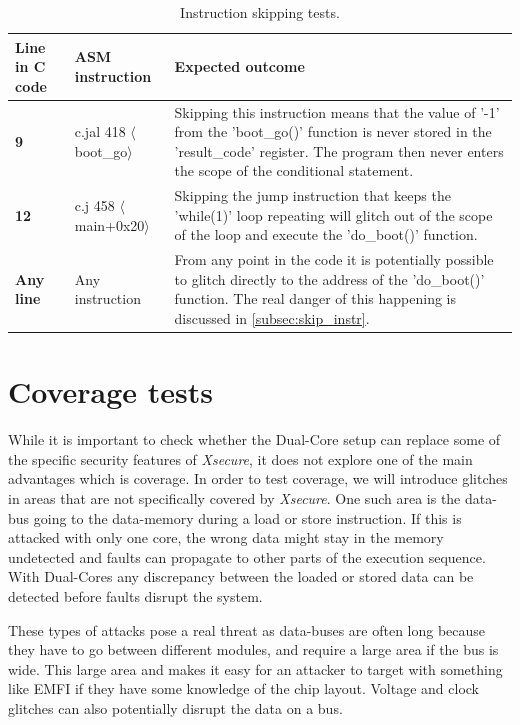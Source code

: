 \begin{table}[h]
\centering
\caption{Instruction skipping tests.}
\label{tab:instr_skip_test}
\begin{tabular}{m{2.5cm}m{3.5cm}m{7.5cm}}
\toprule 
Line in C code & ASM instruction & Expected outcome \\
\midrule
\rowcolor{black!20} \textbf{9} & c.jal 418 $\langle$boot\_go$\rangle$ & Skipping this instruction means that the value of '-1' from the 'boot\_go()' function is never stored in the 'result\_code' register. The program then never enters the scope of the conditional statement. \\
\textbf{12} & c.j 458 $\langle$main+0x20$\rangle$ & Skipping the jump instruction that keeps the 'while(1)' loop repeating will glitch out of the scope of the loop and execute the 'do\_boot()' function.  \\
\rowcolor{black!20} \textbf{Any line} & Any instruction & From any point in the code it is potentially possible to glitch directly to the address of the 'do\_boot()' function. The real danger of this happening is discussed in \autoref{subsec:skip_instr}. \\
\bottomrule
\end{tabular}
\end{table}

\section{Coverage tests}
\label{sec:coverage_test}

While it is important to check whether the Dual-Core setup can replace some of the specific security features of \textit{Xsecure}, it does not explore one of the main advantages which is coverage. In order to test coverage, we will introduce glitches in areas that are not specifically covered by \textit{Xsecure}. One such area is the data-bus going to the data-memory during a load or store instruction. If this is attacked with only one core, the wrong data might stay in the memory undetected and faults can propagate to other parts of the execution sequence. With Dual-Cores any discrepancy between the loaded or stored data can be detected before faults disrupt the system. 

These types of attacks pose a real threat as data-buses are often long because they have to go between different modules, and require a large area if the bus is wide. This large area and makes it easy for an attacker to target with something like EMFI if they have some knowledge of the chip layout. Voltage and clock glitches can also potentially disrupt the data on a bus. 

